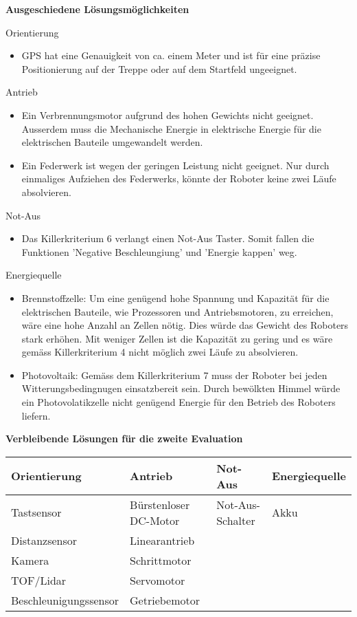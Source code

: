 \textbf{Ausgeschiedene Lösungsmöglichkeiten}

Orientierung
\begin{itemize}
    \item GPS hat eine Genauigkeit von ca. einem Meter und ist für eine präzise Positionierung auf der Treppe oder auf dem Startfeld ungeeignet.
\end{itemize}
Antrieb
\begin{itemize}
    \item Ein Verbrennungsmotor aufgrund des hohen Gewichts nicht geeignet. Ausserdem muss die Mechanische Energie in elektrische Energie für die elektrischen Bauteile umgewandelt werden.
    \item Ein Federwerk ist wegen der geringen Leistung nicht geeignet. Nur durch einmaliges Aufziehen des Federwerks, könnte der Roboter keine zwei Läufe absolvieren.
\end{itemize}
Not-Aus
\begin{itemize}
    \item Das Killerkriterium 6 verlangt einen Not-Aus Taster. Somit fallen die Funktionen 'Negative Beschleungiung' und 'Energie kappen' weg.
\end{itemize}
Energiequelle
\begin{itemize}
    \item Brennstoffzelle: Um eine genügend hohe Spannung und Kapazität für die elektrischen Bauteile, wie Prozessoren und Antriebsmotoren, zu erreichen, wäre eine hohe Anzahl an Zellen nötig. Dies würde das Gewicht des Roboters stark erhöhen. Mit weniger Zellen ist die Kapazität zu gering und es wäre gemäss Killerkriterium 4 nicht möglich zwei Läufe zu absolvieren.
    \item Photovoltaik: Gemäss dem Killerkriterium 7 muss der Roboter bei jeden Witterungsbedingnugen einsatzbereit sein. Durch bewölkten Himmel würde ein Photovolatikzelle nicht genügend Energie für den Betrieb des Roboters liefern.
\end{itemize}

\textbf{Verbleibende Lösungen für die zweite Evaluation}
\begin{center}
\begin{tabular}{ l l l l}
 \textbf{Orientierung} & \textbf{Antrieb} & \textbf{Not-Aus} & \textbf{Energiequelle} \\ 
 \hline
 Tastsensor & Bürstenloser DC-Motor & Not-Aus-Schalter & Akku\\  
 Distanzsensor & Linearantrieb &  &\\
 Kamera & Schrittmotor & &\\
 TOF/Lidar & Servomotor & &\\
 Beschleunigungssensor & Getriebemotor & & 
\end{tabular}
\end{center}





